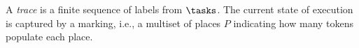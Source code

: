 A \emph{trace} is a finite sequence of labels from $\tasks$. 
The current state of execution is captured by a marking, i.e., a multiset of places $P$ indicating how many tokens populate each place.
